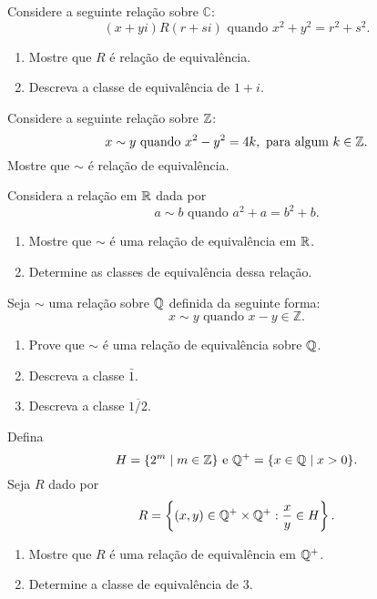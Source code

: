 \documentclass[12pt]{exam}
\begin{document}

\vspace{.3cm}

\questao{} Considere a seguinte rela{\c c}{\~a}o sobre $\mathbb{C}$:
\[
    (x+yi) R (r+si) \mbox{ quando } x^2+y^2=r^2+s^2.
\]
\begin{enumerate}[label={\alph*})]
    \item Mostre que $R$ {\'e} rela{\c c}{\~a}o de equival{\^e}ncia.
    \item Descreva a classe de equival{\^e}ncia de $1+i$.
\end{enumerate}

\vspace{.3cm}

\questao{} Considere a seguinte rela\c{c}\~ao sobre $\mathbb{Z}$:
\[
    x \sim y \mbox{ quando }  x^2 - y^2 = 4k, \mbox{ para algum } k \in \mathbb{Z}.
\]
Mostre que $\sim$ {\'e} rela{\c c}{\~a}o de equival{\^e}ncia.

\vspace{.3cm}

\questao{} Considera a relação em $\mathbb{R}$ dada por
\[
    a \sim b \mbox{ quando } a^2 + a = b^2 + b.
\]
\begin{enumerate}[label={\alph*})]
    \item Mostre que $\sim$ é uma relação de equivalência em $\mathbb{R}$.
    \item Determine as classes de equivalência dessa relação.
\end{enumerate}

\vspace{.3cm}

\questao{} Seja $\sim$ uma rela{\c c}{\~a}o sobre $\mathbb{Q}$ definida da seguinte forma:
\[
    x \sim y \mbox{ quando } x - y \in \mathbb{Z}.
\]
\begin{enumerate}[label={\alph*})]
    \item Prove que $\sim$ {\'e} uma rela{\c c}{\~a}o de equival{\^e}ncia sobre $\mathbb{Q}$.
    \item Descreva a classe $\bar{1}$.
    \item Descreva a classe $\overline{1/2}$.
\end{enumerate}

\vspace{.3cm}

\questao{} Defina
\[
    H = \{2^m \mid m \in \mathbb{Z}\} \mbox{ e } \mathbb{Q}^+ = \{x \in \mathbb{Q} \mid x > 0\}.
\]
Seja $R$ dado por
\[
    R = \left\{(x,y) \in \mathbb{Q}^+\times \mathbb{Q}^+ : \frac{x}{y} \in H\right\}.
\]
\begin{enumerate}[label={\alph*})]
    \item Mostre que $R$ \'e uma rela\c{c}\~ao de equival\^encia em $\mathbb{Q}^+$.
    \item Determine a classe de equival\^encia de $3$.
\end{enumerate}
\vspace{.3cm}
\end{document}
